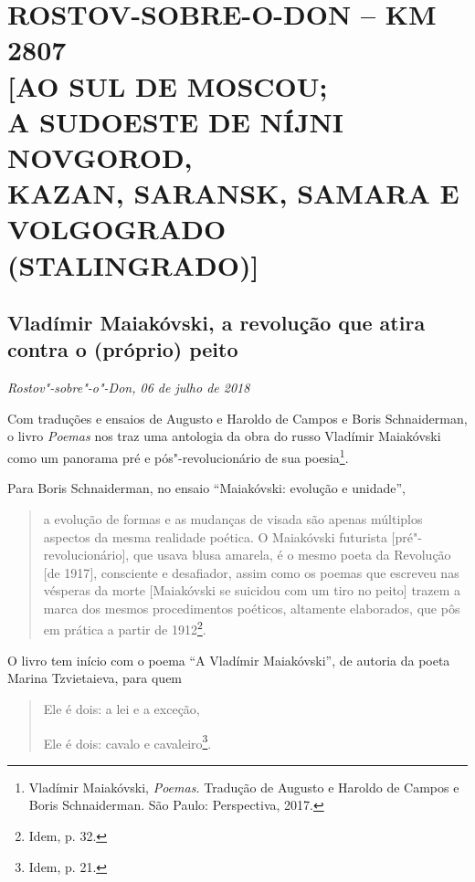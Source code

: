 \movetooddpage
{}
\part*{ROSTOV-SOBRE-O-DON -- KM 2807\\{[}AO SUL DE MOSCOU;\\A SUDOESTE DE NÍJNI NOVGOROD,\\KAZAN, SARANSK, SAMARA E\\VOLGOGRADO (STALINGRADO){]}}

\chapter*{Vladímir Maiakóvski, a revolução que atira contra o (próprio) peito}

\begin{flushright}
\emph{Rostov"-sobre"-o"-Don, 06 de julho de 2018}
\end{flushright}

Com traduções e ensaios de Augusto e Haroldo de Campos e Boris
Schnaiderman, o livro \emph{Poemas} nos traz uma antologia da obra do
russo Vladímir Maiakóvski como um panorama pré e pós"-revolucionário de
sua poesia\footnote{Vladímir Maiakóvski, \emph{Poemas.} Tradução de
  Augusto e Haroldo de Campos e Boris Schnaiderman. São Paulo:
  Perspectiva, 2017.}.

Para Boris Schnaiderman, no ensaio ``Maiakóvski: evolução e unidade'',

\begin{quote}
a evolução de formas e as mudanças de visada são apenas múltiplos
aspectos da mesma realidade poética. O Maiakóvski futurista
{[}pré"-revolucionário{]}, que usava blusa amarela, é o mesmo poeta da
Revolução {[}de 1917{]}, consciente e desafiador, assim como os poemas
que escreveu nas vésperas da morte {[}Maiakóvski se suicidou com um tiro
no peito{]} trazem a marca dos mesmos procedimentos poéticos, altamente
elaborados, que pôs em prática a partir de 1912\footnote{Idem, p. 32.}.
\end{quote}

O livro tem início com o poema ``A Vladímir Maiakóvski'', de autoria da
poeta Marina Tzvietaieva, para quem

\begin{quote}
\forceindent{}Ele é dois: a lei e a exceção,

Ele é dois: cavalo e cavaleiro\footnote{Idem, p. 21.}.
\end{quote}

